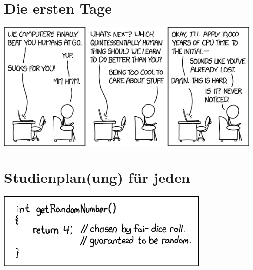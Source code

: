 \documentclass[
  final,
  a4paper,              %
  style=screen,
  twoside,
  nexus,                %
  lnum,                 %
]{tubsartcl}
\begin{document}
	\clearpage

	\listoftodos
	\clearpage

	\setcounter{page}{1}
	\tableofcontents
	
	\newpage

	\section{Die ersten Tage}
		
		
		\vfill
		\begin{center}
		\includegraphics[totalheight=6cm]{bilder/XKCD/computers_vs_humans}
		\end{center}
		\vfill
	\newpage

	\section{Studienplan(ung) für jeden}
		\label{studienplan}
		\begin{multicols}{2}
		
		\end{multicols}
		\vfill
		\begin{center}
		\includegraphics[totalheight=3cm]{bilder/XKCD/random_number}
		\end{center}
		\vfill
	\newpage
\end{document}
